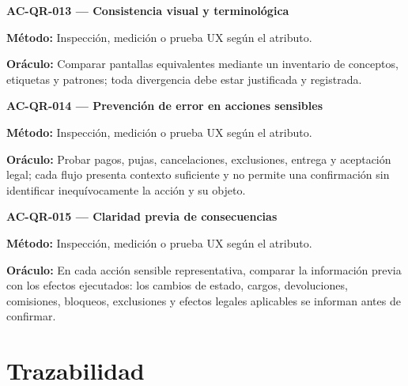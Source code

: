 \documentclass[10pt,letterpaper]{article}
\begin{document}
\noindent\textbf{AC-QR-013 --- Consistencia visual y terminológica}\par
\textbf{Método:} Inspección, medición o prueba UX según el atributo.\par
\textbf{Oráculo:} Comparar pantallas equivalentes mediante un inventario de conceptos, etiquetas y patrones; toda divergencia debe estar justificada y registrada.\par\vspace{0.45em}
\noindent\textbf{AC-QR-014 --- Prevención de error en acciones sensibles}\par
\textbf{Método:} Inspección, medición o prueba UX según el atributo.\par
\textbf{Oráculo:} Probar pagos, pujas, cancelaciones, exclusiones, entrega y aceptación legal; cada flujo presenta contexto suficiente y no permite una confirmación sin identificar inequívocamente la acción y su objeto.\par\vspace{0.45em}
\noindent\textbf{AC-QR-015 --- Claridad previa de consecuencias}\par
\textbf{Método:} Inspección, medición o prueba UX según el atributo.\par
\textbf{Oráculo:} En cada acción sensible representativa, comparar la información previa con los efectos ejecutados: los cambios de estado, cargos, devoluciones, comisiones, bloqueos, exclusiones y efectos legales aplicables se informan antes de confirmar.\par\vspace{0.45em}
\section{Trazabilidad}
\end{document}
